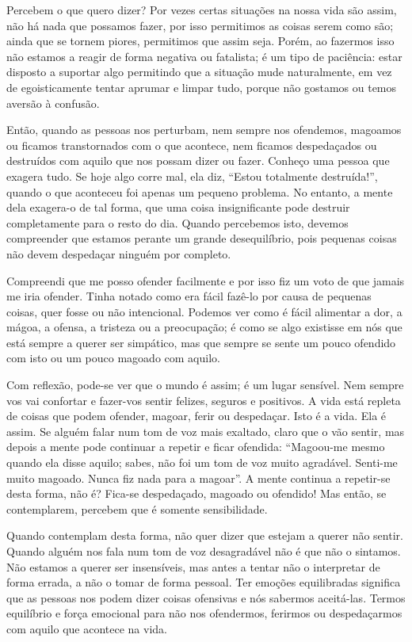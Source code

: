 Percebem o que quero dizer? Por vezes certas situações na nossa vida são assim,
não há nada que possamos fazer, por isso permitimos as coisas serem como são;
ainda que se tornem piores, permitimos que assim seja. Porém, ao fazermos isso
não estamos a reagir de forma negativa ou fatalista; é um tipo de paciência:
estar disposto a suportar algo permitindo que a situação mude naturalmente, em
vez de egoisticamente tentar aprumar e limpar tudo, porque não gostamos ou temos
aversão à confusão.

Então, quando as pessoas nos perturbam, nem sempre nos ofendemos, magoamos ou
ficamos transtornados com o que acontece, nem ficamos despedaçados ou destruídos
com aquilo que nos possam dizer ou fazer. Conheço uma pessoa que exagera tudo.
Se hoje algo corre mal, ela diz, “Estou totalmente destruída!”, quando o que
aconteceu foi apenas um pequeno problema. No entanto, a mente dela exagera-o de
tal forma, que uma coisa insignificante pode destruir completamente para o resto
do dia. Quando percebemos isto, devemos compreender que estamos perante um
grande desequilíbrio, pois pequenas coisas não devem despedaçar ninguém por
completo.

Compreendi que me posso ofender facilmente e por isso fiz um voto de que jamais
me iria ofender. Tinha notado como era fácil fazê-lo por causa de pequenas
coisas, quer fosse ou não intencional. Podemos ver como é fácil alimentar a dor,
a mágoa, a ofensa, a tristeza ou a preocupação; é como se algo existisse em nós
que está sempre a querer ser simpático, mas que sempre se sente um pouco
ofendido com isto ou um pouco magoado com aquilo.

Com reflexão, pode-se ver que o mundo é assim; é um lugar sensível. Nem sempre
vos vai confortar e fazer-vos sentir felizes, seguros e positivos. A vida está
repleta de coisas que podem ofender, magoar, ferir ou despedaçar. Isto é a vida.
Ela é assim. Se alguém falar num tom de voz mais exaltado, claro que o vão
sentir, mas depois a mente pode continuar a repetir e ficar ofendida: “Magoou-me
mesmo quando ela disse aquilo; sabes, não foi um tom de voz muito agradável.
Senti-me muito magoado. Nunca fiz nada para a magoar”. A mente continua a
repetir-se desta forma, não é? Fica-se despedaçado, magoado ou ofendido! Mas
então, se contemplarem, percebem que é somente sensibilidade.

Quando contemplam desta forma, não quer dizer que estejam a querer não sentir.
Quando alguém nos fala num tom de voz desagradável não é que não o sintamos. Não
estamos a querer ser insensíveis, mas antes a tentar não o interpretar de forma
errada, a não o tomar de forma pessoal. Ter emoções equilibradas significa que
as pessoas nos podem dizer coisas ofensivas e nós sabermos aceitá-las. Termos
equilíbrio e força emocional para não nos ofendermos, ferirmos ou despedaçarmos
com aquilo que acontece na vida.

